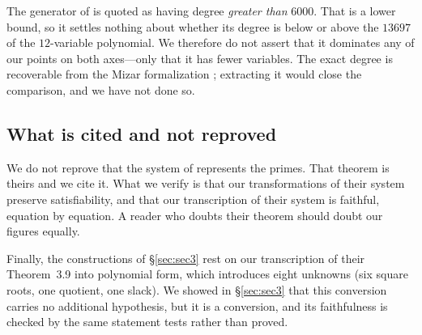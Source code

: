 The generator of \cite{matiyasevich1981} is quoted as having degree
\emph{greater than} $6000$. That is a lower bound, so it settles nothing about
whether its degree is below or above the $13697$ of the $12$-variable
polynomial. We therefore do not assert that it dominates any of our points on
both axes---only that it has fewer variables. The exact degree is recoverable
from the Mizar formalization \cite{pak2022ten}; extracting it would close the
comparison, and we have not done so.

\subsection{What is cited and not reproved}

We do not reprove that the system of \cite{jsww1976} represents the primes. That
theorem is theirs and we cite it. What we verify is that our transformations of
their system preserve satisfiability, and that our transcription of their system
is faithful, equation by equation. A reader who doubts their theorem should
doubt our figures equally.

Finally, the constructions of \S\ref{sec:sec3} rest on our transcription of
their Theorem~3.9 into polynomial form, which introduces eight unknowns (six
square roots, one quotient, one slack). We showed in \S\ref{sec:sec3} that this
conversion carries no additional hypothesis, but it is a conversion, and its
faithfulness is checked by the same statement tests rather than proved.
